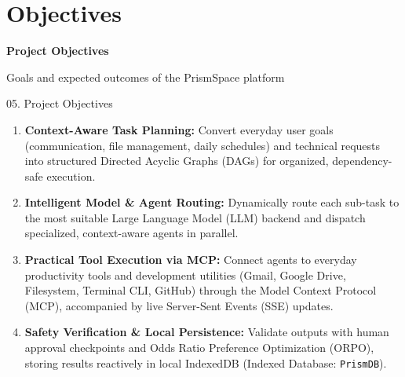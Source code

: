\documentclass[aspectratio=169,10pt]{beamer}
\begin{document}
\section{Objectives}

\begin{frame}[plain]
\vfill
\begin{center}
  {\color{lavenderDark}\fontsize{25}{30}\selectfont\bfseries Project Objectives\par}
  \vspace{0.45em}
  {\color{prismTeal!85!black}\large Goals and expected outcomes of the PrismSpace platform}
\end{center}
\vfill
\end{frame}

\begin{frame}[t]{05. Project Objectives}
\vspace{0.55em}
  \begin{minipage}{0.94\linewidth}
  \fontsize{8.6}{11.2}\selectfont
  \begin{enumerate}\setlength{\itemsep}{12pt}\setlength{\leftmargin}{0.34in}
    \item \textbf{Context-Aware Task Planning:} Convert everyday user goals (communication, file management, daily schedules) and technical requests into structured Directed Acyclic Graphs (DAGs) for organized, dependency-safe execution.
    \item \textbf{Intelligent Model \& Agent Routing:} Dynamically route each sub-task to the most suitable Large Language Model (LLM) backend and dispatch specialized, context-aware agents in parallel.
    \item \textbf{Practical Tool Execution via MCP:} Connect agents to everyday productivity tools and development utilities (Gmail, Google Drive, Filesystem, Terminal CLI, GitHub) through the Model Context Protocol (MCP), accompanied by live Server-Sent Events (SSE) updates.
    \item \textbf{Safety Verification \& Local Persistence:} Validate outputs with human approval checkpoints and Odds Ratio Preference Optimization (ORPO), storing results reactively in local IndexedDB (Indexed Database: \texttt{PrismDB}).
  \end{enumerate}
  \end{minipage}
\end{frame}
\end{document}
